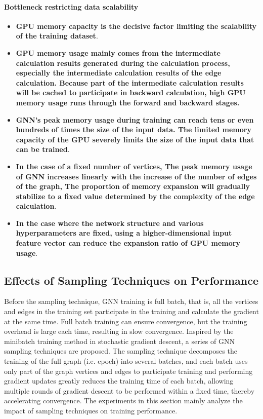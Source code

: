 \paragraph{Bottleneck restricting data scalability}
\begin{itemize}
    \item \textbf{GPU memory capacity is the decisive factor limiting the scalability of the training dataset}.
    \item \textbf{GPU memory usage mainly comes from the intermediate calculation results generated during the calculation process,
              especially the intermediate calculation results of the edge calculation. Because part of the intermediate calculation results
              will be cached to participate in backward calculation, high GPU memory usage runs through the forward and backward stages.}
    \item \textbf{GNN's peak memory usage during training can reach tens or even hundreds of times the size of the input data. The limited memory capacity of the GPU severely limits the size of the input data that can be trained}.
    \item \textbf{In the case of a fixed number of vertices, The peak memory usage of GNN increases linearly with the increase of the number of edges of the graph, The proportion of memory expansion will gradually stabilize to a fixed value determined by the complexity of the edge calculation}.
    \item \textbf{In the case where the network structure and various hyperparameters are fixed, using a higher-dimensional input feature vector can reduce the expansion ratio of GPU memory usage}.
\end{itemize}

\label{sec:memory_usage_analysis}
\subsection{Effects of Sampling Techniques on Performance}

Before the sampling technique, GNN training is full batch, that is, all the vertices and edges in the training set participate in the training and calculate the gradient at the same time.
Full batch training can ensure convergence, but the training overhead is large each time, resulting in slow convergence.
Inspired by the minibatch training method in stochastic gradient descent, a series of GNN sampling techniques are proposed.
The sampling technique decomposes the training of the full graph (i.e. epoch) into several batches, and
each batch uses only part of the graph vertices and edges to participate training and performing gradient
updates greatly reduces the training time of each batch, allowing multiple rounds of gradient descent to
be performed within a fixed time, thereby accelerating convergence. The experiments in this section mainly
analyze the impact of sampling techniques on training performance.

